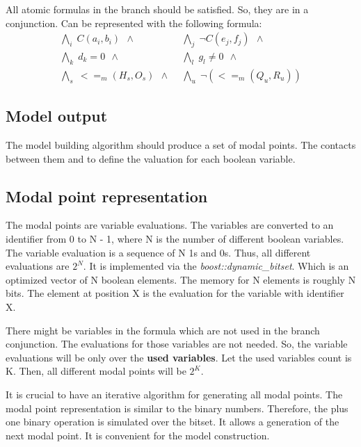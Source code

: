 \documentclass{article}
\begin{document}
	All atomic formulas in the branch should be satisfied. So, they are in a conjunction. Can be represented with the following formula:
	\begin{align*}
		\bigwedge\nolimits_{i} \; C(a_i, b_i) \:\: \wedge \:\: &
		\bigwedge\nolimits_{j} \; \neg C(e_j, f_j) \:\: \wedge \:\: \\
		\bigwedge\nolimits_{k} \; d_k = 0 \:\: \wedge \:\: &
		\bigwedge\nolimits_{l} \; g_l \neq 0 \:\: \wedge \:\: \\
		\bigwedge\nolimits_{s} \; <=_m(H_s, O_s) \:\: \wedge \:\: &
		\bigwedge\nolimits_{u} \; \neg (<=_m(Q_u, R_u) )
	\end{align*}

	\subsection*{Model output}
	\label{tableaux:branch:output}
	The model building algorithm should produce a set of modal points. The contacts between them and to define the valuation for each boolean variable.

	\subsection{Modal point representation}
	The modal points are variable evaluations. The variables are converted to an identifier from 0 to N - 1, where N is the number of different boolean variables. The variable evaluation is a sequence of N 1s and 0s. Thus, all different evaluations are $2^N$. It is implemented via the \textit{boost::dynamic\_bitset}. Which is an optimized vector of N boolean elements. The memory for N elements is roughly N bits. The element at position X is the evaluation for the variable with identifier X. 

	There might be variables in the formula which are not used in the branch conjunction. The evaluations for those variables are not needed. So, the variable evaluations will be only over the \textbf{used variables}. Let the used variables count is K. Then, all different modal points will be $2^K$.

	It is crucial to have an iterative algorithm for generating all modal points. The modal point representation is similar to the binary numbers. Therefore, the plus one binary operation is simulated over the bitset. It allows a generation of the next modal point. It is convenient for the model construction.
\end{document}
